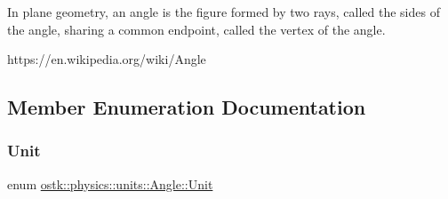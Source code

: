In plane geometry, an angle is the figure formed by two rays, called the sides of the angle, sharing a common endpoint, called the vertex of the angle.

https\+://en.wikipedia.\+org/wiki/\+Angle 

\subsection{Member Enumeration Documentation}
\mbox{\label{classostk_1_1physics_1_1units_1_1_angle_aea1f8018b1d378b9dee56959d8eb9def}} 
\subsubsection{\texorpdfstring{Unit}{Unit}}
{\footnotesize\ttfamily enum \hyperlink{classostk_1_1physics_1_1units_1_1_angle_aea1f8018b1d378b9dee56959d8eb9def}{ostk\+::physics\+::units\+::\+Angle\+::\+Unit}\hspace{0.3cm}{\ttfamily [strong]}}

